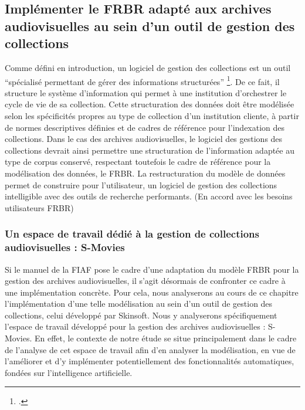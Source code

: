 \subsection{Implémenter le FRBR adapté aux archives audiovisuelles au sein d’un outil de gestion des collections} 



Comme défini en introduction, un logiciel de gestion des collections est un outil “spécialisé permettant de gérer des informations structurées” \footcite{zotero-item-766}. De ce fait, il structure le système d’information qui permet à une institution d’orchestrer le cycle de vie de sa collection. Cette structuration des données doit être modélisée selon les spécificités propres au type de collection d’un institution cliente, à partir de normes descriptives définies et de cadres de référence pour l’indexation des collections. Dans le cas des archives audiovisuelles, le logiciel des gestions des collections devrait ainsi permettre une structuration de l’information adaptée au type de corpus conservé, respectant toutefois le cadre de référence pour la modélisation des données, le FRBR. La restructuration du modèle de données permet de construire pour l’utilisateur, un logiciel de gestion des collections intelligible avec des outils de recherche performants. (En accord avec les besoins utilisateurs FRBR)  


\subsubsection{Un espace de travail dédié à la gestion de collections audiovisuelles : S-Movies}

Si le manuel de la FIAF pose le cadre d’une adaptation du modèle FRBR pour la gestion des archives audiovisuelles, il s'agit désormais de confronter ce cadre à une implémentation concrète. Pour cela, nous analyserons au cours de ce chapitre l’implémentation d’une telle modélisation au sein d’un outil de gestion des collections, celui développé par Skinsoft. Nous y analyserons spécifiquement l’espace de travail développé pour la gestion des archives audiovisuelles : S-Movies. En effet, le contexte de notre étude se situe principalement dans le cadre de l’analyse de cet espace de travail afin d’en analyser la modélisation, en vue de l’améliorer et d’y implémenter potentiellement des fonctionnalités automatiques, fondées sur l’intelligence artificielle.  

